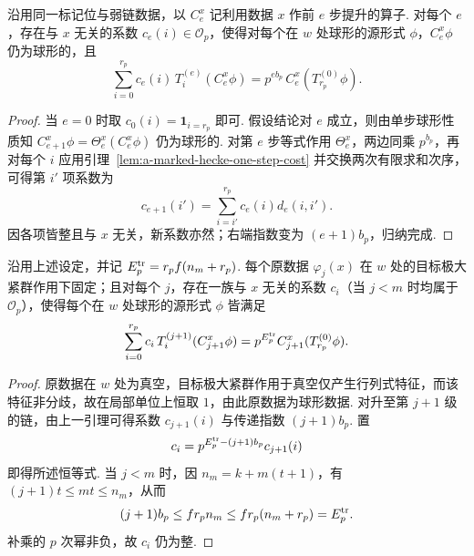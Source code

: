 \begin{lemma}
\label{lem:a-marked-hecke-chain-transfer}
\emitthmsource
沿用同一标记位与弱链数据，以 $C_e^x$ 记利用数据 $x$ 作前 $e$ 步提升的算子. 对每个 $e$，存在与 $x$ 无关的系数 $c_e(i)\in\mathcal O_p$，使得对每个在 $w$ 处球形的源形式 $\phi$，$C_e^x\phi$ 仍为球形的，且
\[
 \sum_{i=0}^{r_p}c_e(i)\,T_i^{(e)}(C_e^x\phi)
     =p^{e b_p}\,C_e^x(T_{r_p}^{(0)}\phi).
\]
\end{lemma}
\begin{proof}
当 $e=0$ 时取 $c_0(i)=\mathbf 1_{i=r_p}$ 即可. 假设结论对 $e$ 成立，则由单步球形性质知 $C_{e+1}^x\phi=\Theta_e^x(C_e^x\phi)$ 仍为球形的. 对第 $e$ 步等式作用 $\Theta_e^x$，两边同乘 $p^{b_p}$，再对每个 $i$ 应用引理~\ref{lem:a-marked-hecke-one-step-cost} 并交换两次有限求和次序，可得第 $i'$ 项系数为
\[
 c_{e+1}(i')=\sum_{i=i'}^{r_p}c_e(i)d_e(i,i').
\]
因各项皆整且与 $x$ 无关，新系数亦然；右端指数变为 $(e+1)b_p$，归纳完成.
\end{proof}

\begin{lemma}
\label{lem:a-single-mark-hecke-transfer}
\emitthmsource
沿用上述设定，并记 $E_p^{\rm tr}=r_pf(n_m+r_p)$. 每个原数据 $\varphi_j(x)$ 在 $w$ 处的目标极大紧群作用下固定；且对每个 $j$，存在一族与 $x$ 无关的系数 $c_i$（当 $j<m$ 时均属于 $\mathcal O_p$），使得每个在 $w$ 处球形的源形式 $\phi$ 皆满足
\[
 \sum_{i=0}^{r_p} c_i\,T_i^{(j+1)}(C_{j+1}^x\phi)
    =p^{E_p^{\rm tr}} C_{j+1}^x(T_{r_p}^{(0)}\phi).
\]
\end{lemma}
\begin{proof}
原数据在 $w$ 处为真空，目标极大紧群作用于真空仅产生行列式特征，而该特征非分歧，故在局部单位上恒取 $1$，由此原数据为球形数据. 对升至第 $j+1$ 级的链，由上一引理可得系数 $c_{j+1}(i)$ 与传递指数 $(j+1)b_p$. 置
\[
 c_i=p^{E_p^{\rm tr}-(j+1)b_p}c_{j+1}(i)
\]
即得所述恒等式. 当 $j<m$ 时，因 $n_m=k+m(t+1)$，有 $(j+1)t\le mt\le n_m$，从而
\[
 (j+1)b_p\le fr_p n_m\le fr_p(n_m+r_p)=E_p^{\rm tr}.
\]
补乘的 $p$ 次幂非负，故 $c_i$ 仍为整.
\end{proof}

